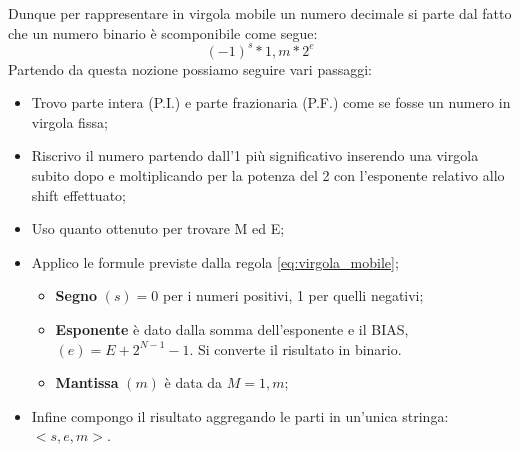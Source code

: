 Dunque per rappresentare in virgola mobile un numero decimale si parte dal fatto che un numero binario è scomponibile come segue:
\begin{equation} \label{eq:virgola_mobile}
    (-1)^s*1,m*2^e
\end{equation}
Partendo da questa nozione possiamo seguire vari passaggi:
\begin{itemize}
    \item Trovo parte intera (P.I.) e parte frazionaria (P.F.) come se fosse un numero in virgola fissa;
    \item Riscrivo il numero partendo dall'1 più significativo inserendo una virgola subito dopo e moltiplicando per la potenza del 2 con l’esponente relativo allo shift effettuato;
    \item Uso quanto ottenuto per trovare M ed E;
    \item Applico le formule previste dalla regola \ref{eq:virgola_mobile};
    \begin{itemize}
        \item \textbf{Segno} $(s) = 0$ per i numeri positivi, 1 per quelli negativi;
        \item \textbf{Esponente} è dato dalla somma dell'esponente e il BIAS,\\$(e) = E + 2^{N-1}-1$. Si converte il risultato in binario.
        \item \textbf{Mantissa} $(m)$ è data da $M = 1,m$;
    \end{itemize}
    \item Infine compongo il risultato aggregando le parti in un’unica stringa:\\$<s,e,m>$.
\end{itemize}

